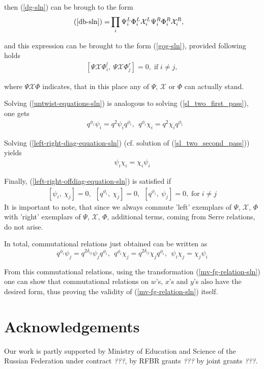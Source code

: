 \documentclass{article}
\newcommand{\lsb}{\left [}
\newcommand{\rsb}{\right ]}
\newcommand{\SB}[1]{\lsb #1 \rsb}
\newcommand{\be}{\begin{eqnarray}}
\newcommand{\ee}{\end{eqnarray}}
\DeclareMathOperator{\If}{if}
\DeclareMathOperator{\For}{for}
\newcommand {\?}{\textit{???}}
\def\Chi{\mathcal{X}}
\newcommand{\EChiL}[1][]{\Chi^L_{#1}}
\newcommand{\EChiR}[1][]{\Chi^R_{#1}}
\newcommand{\EPsiL}[1][]{\Psi^L_{#1}}
\newcommand{\EPsiR}[1][]{\Psi^R_{#1}}
\newcommand{\QPhiL}[1][]{\Phi^L_{#1}}
\newcommand{\QPhiR}[1][]{\Phi^R_{#1}}
\newcommand{\delabel}[1]{(\ref{#1})}
\begin{document}
then \delabel{dg-sln} can be brough to the form
\be
\delabel{db-sln} = & \prod_i \EPsiL[i] \QPhiL[i] \EChiL[i] \EPsiR[i]  \QPhiR[i]  \EChiR[i],
\ee

and this expression can be brought to the form \delabel{gog-sln}, provided following holds
\be
\label{left-right-offdiag-equation-sln}
\SB{\Psi\Chi\Phi^l_i,\ \Psi\Chi\Phi^r_j} = 0, \If i \neq j,
\ee

where $\Psi\Chi\Phi$ indicates, that in this place any of $\Psi$, $\Chi$ or $\Phi$ can actually stand.

Solving \delabel{untwist-equations-sln} is analogous to solving \delabel{sl_two_first_pass},
one gets
\be
& q^{\phi_i} \psi_i = q^2 \psi_i q^{\phi_i},\ \ q^{\phi_i} \chi_i = q^2 \chi_i q^{\phi_i}
\ee

Solving \delabel{left-right-diag-equation-sln} (cf. solution of \delabel{sl_two_second_pass}) yields
\be
\psi_i \chi_i = \chi_i \psi_i
\ee

Finally, \delabel{left-right-offdiag-equation-sln} is satisfied if
\be
\SB{\psi_i,\ \chi_j} = 0,\ \ \SB{q^{\phi_i},\ \chi_j} = 0,\ \ \SB{q^{\phi_i},\ \psi_j} = 0, \For i \neq j
\ee
It is important to note, that since we always commute 'left' exemplars of $\Psi$, $\Chi$, $\Phi$ with
'right' exemplars of $\Psi$, $\Chi$, $\Phi$, additional terms, coming from Serre relations, do not arise.

In total, commutational relations just obtained can be written as
\begin{equation}
\label{comm-relations-psichiphi-sln}
\boxed{
  q^{\phi_i} \psi_j = q^{2\delta_{ij}} \psi_j q^{\phi_i},\ \ 
  q^{\phi_i} \chi_j = q^{2\delta_{ij}} \chi_j q^{\phi_i},\ \ 
  \psi_i \chi_j = \chi_j \psi_i
}
\end{equation}

From this commutational relations, using the transformation \delabel{mv-fg-relation-sln}
one can show that commutational relations on $w$'s, $x$'s and $y$'s also have the desired form,
 thus proving the validity of \delabel{mv-fg-relation-sln} itself.


\section*{Acknowledgements}

Our work is partly supported by Ministry of Education and Science of
the Russian Federation under contract \?, by RFBR
grants \? by joint grants \?.

\appendix
\end{document}
